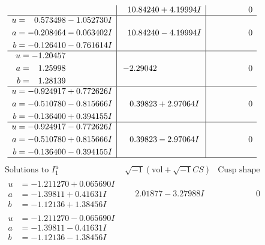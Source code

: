 \documentclass[1p]{elsarticle_modified}
\theoremstyle{definition}
\newcommand{\I}{\sqrt{-1}}
\begin{document}
$$\begin{array}{c|c|c}
 & \phantom{-}10.84240 + 4.19994 I & \phantom{-0.000000 } 0 \\ \hline\begin{aligned}
u &= \phantom{-}0.573498 - 1.052730 I \\
a &= -0.208464 - 0.063402 I \\
b &= -0.126410 - 0.761614 I\end{aligned}
 & \phantom{-}10.84240 - 4.19994 I & \phantom{-0.000000 } 0 \\ \hline\begin{aligned}
u &= -1.20457\phantom{ +0.000000I} \\
a &= \phantom{-}1.25998\phantom{ +0.000000I} \\
b &= \phantom{-}1.28139\phantom{ +0.000000I}\end{aligned}
 & -2.29042\phantom{ +0.000000I} & \phantom{-0.000000 } 0 \\ \hline\begin{aligned}
u &= -0.924917 + 0.772626 I \\
a &= -0.510780 - 0.815666 I \\
b &= -0.136400 + 0.394155 I\end{aligned}
 & \phantom{-}0.39823 + 2.97064 I & \phantom{-0.000000 } 0 \\ \hline\begin{aligned}
u &= -0.924917 - 0.772626 I \\
a &= -0.510780 + 0.815666 I \\
b &= -0.136400 - 0.394155 I\end{aligned}
 & \phantom{-}0.39823 - 2.97064 I & \phantom{-0.000000 } 0\\
 \hline 
 \end{array}$$\newpage$$\begin{array}{c|c|c}  
\text{Solutions to }I^u_{1}& \I (\text{vol} + \sqrt{-1}CS) & \text{Cusp shape}\\
 \hline 
\begin{aligned}
u &= -1.211270 + 0.065690 I \\
a &= -1.39811 + 0.41631 I \\
b &= -1.12136 + 1.38456 I\end{aligned}
 & \phantom{-}2.01877 - 3.27988 I & \phantom{-0.000000 } 0 \\ \hline\begin{aligned}
u &= -1.211270 - 0.065690 I \\
a &= -1.39811 - 0.41631 I \\
b &= -1.12136 - 1.38456 I\end{aligned}

\end{array}$$
\end{document}
